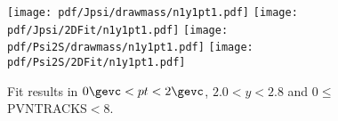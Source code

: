 \begin{figure}[H]
\begin{center}
\texttt{[image: pdf/Jpsi/drawmass/n1y1pt1.pdf]}
\texttt{[image: pdf/Jpsi/2DFit/n1y1pt1.pdf]}
\vspace*{-0.5cm}
\texttt{[image: pdf/Psi2S/drawmass/n1y1pt1.pdf]}
\texttt{[image: pdf/Psi2S/2DFit/n1y1pt1.pdf]}
\vspace*{-0.5cm}
\end{center}
\caption{Fit results in $0\gevc<pt<2\gevc$, $2.0<y<2.8$ and 0$\leq$PVNTRACKS$<$8.}
\label{Fitn1y1pt1}
\end{figure}
